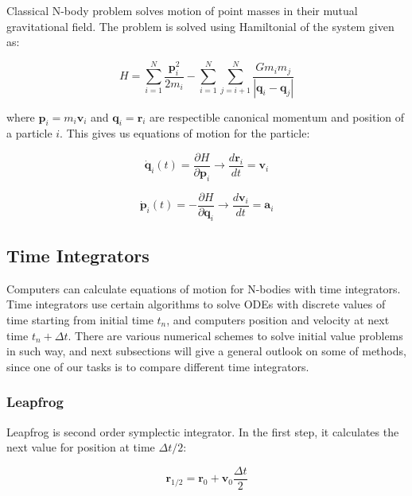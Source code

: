 \documentclass[12pt,a4paper]{article}
\begin{document}
Classical N-body problem solves motion of point masses in their mutual gravitational field. The problem is solved using Hamiltonial of the system given as:

\begin{equation}
	H = \sum_{i=1}^{N} \frac{\textbf{p}_i^2}{2 m_i} - \sum_{i=1}^{N} \sum_{j=i+1}^{N} \frac{G m_i m_j}{|\textbf{q}_i - \textbf{q}_j|}
\end{equation}

where $\textbf{p}_i = m_i \textbf{v}_i$ and $\textbf{q}_i = \textbf{r}_i$ are respectible canonical momentum and position of a particle $i$. This gives us equations of motion for the particle:

\begin{equation}
	\dot{\textbf{q}}_i(t) = \frac{\partial H}{\partial \textbf{p}_i} \xrightarrow{} \frac{d \textbf{r}_i}{dt} = \textbf{v}_i
\end{equation}

\begin{equation}
	\dot{\textbf{p}}_i(t) = -\frac{\partial H}{\partial \textbf{q}_i} \xrightarrow{} \frac{d \textbf{v}_i}{dt} = \textbf{a}_i
\end{equation}

\subsection{Time Integrators}
\label{integrators}
Computers can calculate equations of motion for N-bodies with time integrators. Time integrators use certain algorithms to solve ODEs with discrete values of time starting from initial time $t_n$, and computers position and velocity at next time $t_n+\Delta t$. There are various numerical schemes to solve initial value problems in such way, and next subsections will give a general outlook on some of methods, since one of our tasks is to compare different time integrators.

\subsubsection{Leapfrog}

Leapfrog is second order symplectic integrator. In the first step, it calculates the next value for position at time $\Delta t/2$:

\begin{equation}
	\textbf{r}_{1/2} = \textbf{r}_0 + \textbf{v}_0 \frac{\Delta t}{2}
\end{equation}
\end{document}
